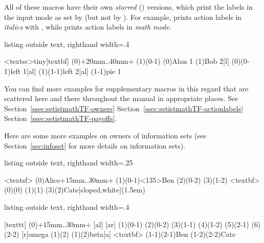 All of these macros have their own \emph{starred} (\xw{*}) versions, which print the labels in the input mode as set by \icmd{\setistmathTF*} (but not by \cmd{\setistmathTF}). For example, \icmd{\xtActionLabel*} prints action labels in \emph{italics} with , while \cmd{\xtActionLabel} prints action labels in \emph{math mode}.

\begin{tcblisting}{listing outside text, righthand width=.4\linewidth}
\begin{istgame}
\xtdistance{20mm}{20mm}
<textsc>{tiny}[textbf]
\istroot(0)+20mm..40mm+ \istb \istb \endist
\istroot(1)(0-1)        \istb \istb \endist
\xtOwner*(0){Alan 1}  \xtOwner(1){Bob 2}[l]
\xtActionLabel(0)(0-1){left 1}[al]
\xtActionLabel*(1)(1-1){left 2}[al]
\xtPayoff*(1-1){pie 1}
\end{istgame}
\end{tcblisting}

You can find more examples for supplementary macros in this regard that are scattered here and there throughout the manual in appropriate places. See Section~\ref{ssec:setistmathTF-owners} Section~\ref{ssec:setistmathTF-actionlabels} Section~\ref{ssec:setistmathTF-payoffs}.

Here are some more examples on owners of information sets (see Section~\ref{sec:infoset} for more details on information sets).

\label{page:xtInfoset*}
\begin{tcblisting}{listing outside text, righthand width=.25\linewidth}
\begin{istgame}
<textsf>
\istroot(0){Alice}+15mm..30mm+    \endist
\istroot(1)(0-1)<135>{Ben}    \endist
\istroot(2)(0-2)     \endist
\istroot(3)(1-2)     \endist
{}<textbf>
\xtInfosetO(0)(0)
\xtInfosetO[rectangle,rounded corners=.2em](1)(1)
\xtInfosetO*[ellipse,fill=blue!60]
           (3)(2){Cate}[sloped,white](1.5em)
\end{istgame}
\end{tcblisting}


\begin{tcblisting}{listing outside text, righthand width=.4\linewidth}
\begin{istgame}
[texttt]
\istroot(0){\alpha}+15mm..30mm+
  [al] [ar] \endist
\istroot(1)(0-1)  \istb \istb \endist
\istroot(2)(0-2)  \istb \istb \endist
\xtdistance{10mm}{10mm}
\istroot(3)(1-1)  \istb \istb \endist
\istroot(4)(1-2)  \istb \istb \endist
\istroot(5)(2-1)  \istb \istb \endist
\istroot(6)(2-2) 
  \istb {}[r]{omega} \endist
\xtInfoset*(1)(2)
\xtInfosetOwner*(1)(2){beta}[a]
<textbf>
\xtCInfoset*(1-1)(2-1){Ben}
\xtCInfoset*(1-2)(2-2){Cate}
\end{istgame}
\end{tcblisting}


